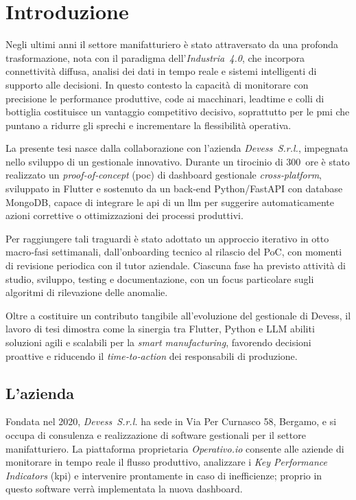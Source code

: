 \chapter{Introduzione}
\label{chap:introduzione}

Negli ultimi anni il settore manifatturiero è stato attraversato da una profonda trasformazione, nota con il paradigma dell’\textit{Industria~4.0}, che 
incorpora connettività diffusa, analisi dei dati in tempo reale e sistemi intelligenti di supporto alle decisioni. In questo contesto la capacità di monitorare con 
precisione le performance produttive, code ai macchinari, \gls{leadtime} e colli di bottiglia costituisce un vantaggio competitivo decisivo, soprattutto per le \gls{pmi} che puntano a ridurre gli sprechi e incrementare la flessibilità operativa.

La presente tesi nasce dalla collaborazione con l’azienda \textit{Devess~S.r.l.}, impegnata nello sviluppo di un gestionale innovativo. Durante un tirocinio di 300~ore è 
stato realizzato un \textit{proof‑of‑concept} (\gls{poc}) di dashboard gestionale \textit{cross‑platform}, sviluppato in Flutter e sostenuto da un back‑end Python/FastAPI 
con database MongoDB, capace di integrare le \gls{api} di un \gls{llm} per suggerire automaticamente azioni correttive o ottimizzazioni dei processi produttivi.

Per raggiungere tali traguardi è stato adottato un approccio iterativo in otto macro‑fasi settimanali, dall’onboarding tecnico al rilascio del PoC, con momenti di revisione 
periodica con il tutor aziendale. Ciascuna fase ha previsto attività di studio, sviluppo, testing e documentazione, con un focus particolare sugli algoritmi di rilevazione delle anomalie.

Oltre a costituire un contributo tangibile all’evoluzione del gestionale di Devess, il lavoro di tesi dimostra come la sinergia tra Flutter, Python e LLM abiliti soluzioni 
agili e scalabili per la \textit{smart manufacturing}, favorendo decisioni proattive e riducendo il \textit{time‑to‑action} dei responsabili di produzione.

\section{L'azienda}
Fondata nel 2020, \textit{Devess~S.r.l.} ha sede in Via Per Curnasco 58, Bergamo, e si occupa di consulenza e realizzazione di software gestionali per il settore manifatturiero. 
La piattaforma proprietaria \textit{Operativo.io} consente alle aziende di monitorare in tempo reale il flusso produttivo, analizzare i \textit{Key Performance Indicators} 
(\gls{kpi}) e intervenire prontamente in caso di inefficienze; proprio in questo software verrà implementata la nuova dashboard.

